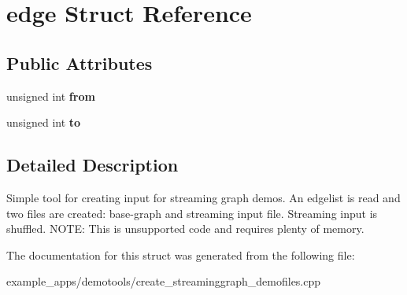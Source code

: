 \hypertarget{structedge}{\section{edge Struct Reference}
\label{structedge}
}
\subsection*{Public Attributes}
\begin{DoxyCompactItemize}
\item 
\hypertarget{structedge_a67f912de70a5da5b5e16a767c52923da}{unsigned int {\bfseries from}}\label{structedge_a67f912de70a5da5b5e16a767c52923da}

\item 
\hypertarget{structedge_a4db084bb02d5108df2736ca5dc79dbc9}{unsigned int {\bfseries to}}\label{structedge_a4db084bb02d5108df2736ca5dc79dbc9}

\end{DoxyCompactItemize}


\subsection{Detailed Description}
Simple tool for creating input for streaming graph demos. An edgelist is read and two files are created\-: base-\/graph and streaming input file. Streaming input is shuffled. N\-O\-T\-E\-: This is unsupported code and requires plenty of memory. 

The documentation for this struct was generated from the following file\-:\begin{DoxyCompactItemize}
\item 
example\-\_\-apps/demotools/create\-\_\-streaminggraph\-\_\-demofiles.\-cpp\end{DoxyCompactItemize}
